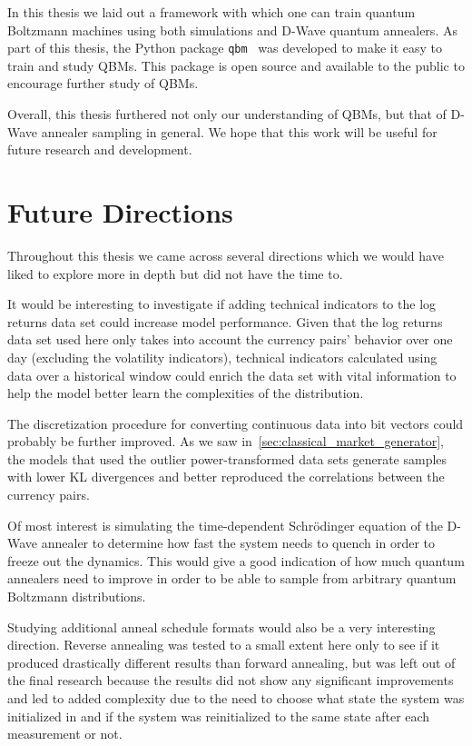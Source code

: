 In this thesis we laid out a framework with which one can train quantum Boltzmann machines using both simulations and D-Wave quantum annealers.
As part of this thesis, the Python package \texttt{qbm}~\cite{qbm} was developed to make it easy to train and study QBMs.
This package is open source and available to the public to encourage further study of QBMs.

Overall, this thesis furthered not only our understanding of QBMs, but that of D-Wave annealer sampling in general.
We hope that this work will be useful for future research and development.

\section{Future Directions}
Throughout this thesis we came across several directions which we would have liked to explore more in depth but did not have the time to.

It would be interesting to investigate if adding technical indicators to the log returns data set could increase model performance.
Given that the log returns data set used here only takes into account the currency pairs' behavior over one day (excluding the volatility indicators), technical indicators calculated using data over a historical window could enrich the data set with vital information to help the model better learn the complexities of the distribution.

The discretization procedure for converting continuous data into bit vectors could probably be further improved.
As we saw in~\cref{sec:classical_market_generator}, the models that used the outlier power-transformed data sets generate samples with lower KL divergences and better reproduced the correlations between the currency pairs.

Of most interest is simulating the time-dependent Schr\"odinger equation of the D-Wave annealer to determine how fast the system needs to quench in order to freeze out the dynamics.
This would give a good indication of how much quantum annealers need to improve in order to be able to sample from arbitrary quantum Boltzmann distributions.

Studying additional anneal schedule formats would also be a very interesting direction.
Reverse annealing was tested to a small extent here only to see if it produced drastically different results than forward annealing, but was left out of the final research because the results did not show any significant improvements and led to added complexity due to the need to choose what state the system was initialized in and if the system was reinitialized to the same state after each measurement or not.
